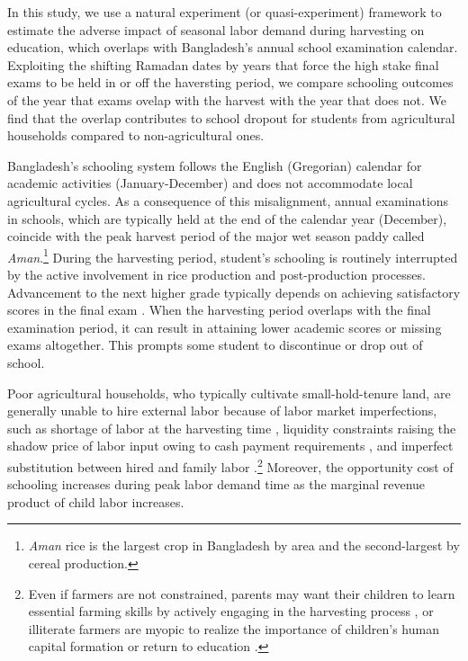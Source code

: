 \documentclass[12pt,letterpaper]{article}
\newcommand{\0}{\ensuremath{\mbox{\boldmath $0$}}}
\begin{document}
In this study, we use a natural experiment (or quasi-experiment) framework to estimate the adverse impact of seasonal labor demand during harvesting on education, which overlaps with Bangladesh's annual school examination calendar. Exploiting the shifting Ramadan dates by years that force the high stake final exams to be held in or off the haversting period, we compare schooling outcomes of the year that exams ovelap with the harvest with the year that does not. We find that the overlap contributes to school dropout for students from agricultural households compared to non-agricultural ones. 

Bangladesh's schooling system follows the English (Gregorian) calendar for academic activities (January-December) and does not accommodate local agricultural cycles. As a consequence of this misalignment, annual examinations in schools, which are typically held at the end of the calendar year (December), coincide with the peak harvest period of the major wet season paddy called \textit{Aman}.\footnote{\textit{Aman} rice is the largest crop in Bangladesh by area and the second-largest by cereal production.} During the harvesting period, student's schooling is routinely interrupted by the active involvement in rice production and post-production processes. Advancement to the next higher grade typically depends on achieving satisfactory scores in the final exam \citep{ADB2017}. When the harvesting period overlaps with the final examination period, it can result in attaining lower academic scores or missing exams altogether. This prompts some student to discontinue or drop out of school. 

Poor agricultural households, who typically cultivate small-hold-tenure land, are generally unable to hire external labor because of labor market imperfections, such as shortage of labor at the harvesting time \citep{rosenzweig1988labor}, liquidity constraints raising the shadow price of labor input owing to cash payment requirements \citep{singh1986agricultural}, and imperfect substitution between hired and family labor \citep{de1991peasant}.\footnote{Even if farmers are not constrained, parents may want their children to learn essential farming skills by actively engaging in the harvesting process \citep{bhalotra2003child}, or illiterate farmers are myopic to realize the importance of children's human capital formation or return to education \citep{BalandRobinson2000}. } Moreover, the opportunity cost of schooling increases during peak labor demand time as the marginal revenue product of child labor increases.
\end{document}
